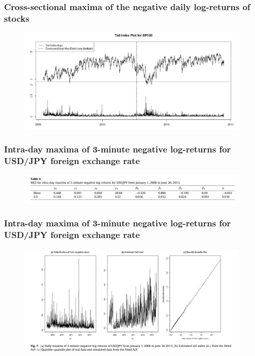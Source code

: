 \documentclass{beamer}
\begin{document}
\begin{frame}
    \frametitle{Cross-sectional maxima of the negative daily log-returns of stocks}

    \begin{figure}
        \includegraphics[width=1\textwidth]{fig3.png}
    \end{figure}

\end{frame}



\begin{frame}
    \frametitle{Intra-day maxima of 3-minute negative log-returns for USD/JPY foreign exchange rate}

    \begin{figure}
        \includegraphics[width=1\textwidth]{table6.png}
    \end{figure}
\end{frame}


\begin{frame}
    \frametitle{Intra-day maxima of 3-minute negative log-returns for USD/JPY foreign exchange rate}

    \begin{figure}
        \includegraphics[width=1\textwidth]{fig7.png}
    \end{figure}
\end{frame}
\end{document}
